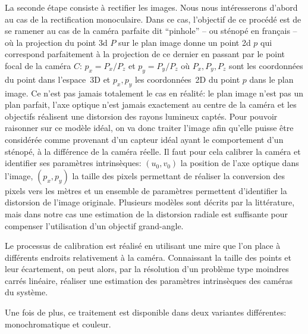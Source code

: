 La seconde étape consiste à rectifier les images. Nous nous
intéresserons d'abord au cas de la rectification
monoculaire. Dans ce cas, l'objectif de ce procédé est de se ramener
au cas de la caméra parfaite dit
``pinhole'' -- ou sténopé en français -- où la projection
du point 3d $P$ sur le plan image donne un point 2d $p$ qui correspond
parfaitement à la projection de ce dernier en passant par le point
focal de la caméra $C$: $p_x = P_x / P_z$ et $p_y = P_y / P_z$ où
$P_x, P_y, P_z$ sont les coordonnées du point dans l'espace 3D et
$p_x, p_y$ les coordonnées 2D du point $p$ dans le plan image. Ce
n'est pas jamais totalement le cas en réalité: le plan image n'est pas
un plan parfait, l'axe optique n'est jamais exactement au centre de la
caméra et les objectifs réalisent une distorsion des
rayons lumineux captés. Pour pouvoir raisonner sur ce modèle idéal, on
va donc traiter l'image afin qu'elle puisse être considérée comme
provenant d'un capteur idéal ayant le comportement d'un sténopé, à la
différence de la caméra réelle. Il faut pour cela calibrer la caméra
et identifier ses paramètres intrinsèques: $(u_0, v_0)$ la position de l'axe optique
dans l'image, $(p_x, p_y)$ la taille des pixels permettant de réaliser
la conversion des pixels vers les mètres et un ensemble de paramètres
permettent d'identifier la distorsion de l'image originale. Plusieurs
modèles sont décrits par la littérature, mais dans notre cas une
estimation de la distorsion radiale est
suffisante pour compenser l'utilisation d'un objectif grand-angle.


Le processus de calibration est
réalisé en utilisant une mire que l'on place à différents endroits
relativement à la caméra. Connaissant la taille des points et leur
écartement, on peut alors, par la résolution d'un problème type
moindres carrés linéaire, réaliser une estimation des paramètres
intrinsèques des caméras du système.

Une fois de plus, ce traitement est disponible dans deux variantes
différentes: monochromatique et couleur.

